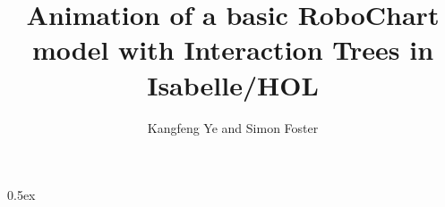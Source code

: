 \documentclass[11pt,a4paper]{article}
\begin{document}
\title{Animation of a basic RoboChart model with Interaction Trees in Isabelle/HOL}

\author{Kangfeng Ye and Simon Foster}

\maketitle

\tableofcontents

\parindent 0pt\parskip 0.5ex



\vspace{4ex}


% 
% 
\end{document}
